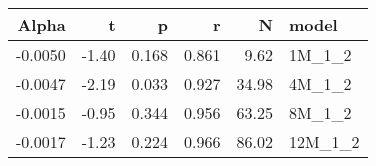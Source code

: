 \begin{table}[ht]
\centering
\begin{tabular}{rrrrrl}
  \hline
Alpha & t & p & r & N & model \\ 
  \hline
-0.0050 & -1.40 & 0.168 & 0.861 & 9.62 & 1M\_1\_2 \\ 
  -0.0047 & -2.19 & 0.033 & 0.927 & 34.98 & 4M\_1\_2 \\ 
  -0.0015 & -0.95 & 0.344 & 0.956 & 63.25 & 8M\_1\_2 \\ 
  -0.0017 & -1.23 & 0.224 & 0.966 & 86.02 & 12M\_1\_2 \\ 
   \hline
\end{tabular}
\end{table}

